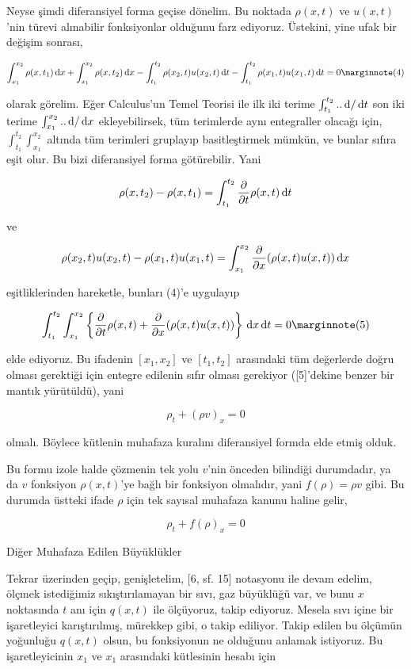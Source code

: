\documentclass[12pt,fleqn]{article}\usepackage{../../common}
\begin{document}
Neyse şimdi diferansiyel forma geçise dönelim. Bu noktada $\rho(x,t)$ ve
$u(x,t)$'nin türevi alınabilir fonksiyonlar olduğunu farz ediyoruz. Üstekini,
yine ufak bir değişim sonrası,

$$
\int _{x_1}^{x_2} \rho(x,t_1) \ud x  +
\int _{x_1}^{x_2} \rho(x,t_2) \ud x -
\int_{t_1}^{t_2}  \rho(x_2,t) u(x_2,t) \ud t -
\int_{t_1}^{t_2} \rho(x_1,t) u(x_1,t) \ud t = 0
\mlabel{4}
$$

olarak görelim. Eğer Calculus'un Temel Teorisi ile ilk iki terime
$\int_{t_1}^{t_2} .. \,\mathrm{d} / \,\mathrm{d} t$ son iki terime $\int_{x_1}^{x_2} .. \,\mathrm{d} / \,\mathrm{d} x$
ekleyebilirsek, tüm terimlerde aynı entegraller olacağı için, 
$\int_{t_1}^{t_2} \int_{x_1}^{x_2} $ altında tüm terimleri gruplayıp
basitleştirmek mümkün, ve bunlar sıfıra eşit olur. Bu bizi diferansiyel
forma götürebilir. Yani

$$
\rho(x,t_2) - \rho(x,t_1) = \int_{t_1}^{t_2}
\frac{\partial }{\partial t} \rho(x,t) \,\mathrm{d} t
$$

ve

$$
\rho(x_2,t)u(x_2,t) - \rho(x_1,t)u(x_1,t) =
\int _{x_1}^{x_2} \frac{\partial }{\partial x} (\rho(x,t)u(x,t)) \,\mathrm{d} x
$$

eşitliklerinden hareketle, bunları (4)'e uygulayıp

$$
\int _{t_1}^{t_2} \int _{x_1}^{x_2}  \left\{
\frac{\partial }{\partial t} \rho(x,t)  +
\frac{\partial }{\partial x} (\rho(x,t)u(x,t))
\right\} \ud x \ud t = 0
\mlabel{5}
$$

elde ediyoruz. Bu ifadenin $[x_1,x_2]$ ve $[t_1,t_2]$ arasındaki tüm değerlerde
doğru olması gerektiği için entegre edilenin sıfır olması gerekiyor ([5]'dekine
benzer bir mantık yürütüldü), yani

$$
\rho_t + (\rho v)_x = 0
$$

olmalı. Böylece kütlenin muhafaza kuralını diferansiyel formda elde etmiş olduk.

Bu formu izole halde çözmenin tek yolu $v$'nin önceden bilindiği durumdadır, ya
da $v$ fonksiyon $\rho(x,t)$'ye bağlı bir fonksiyon olmalıdır, yani
$f(\rho) = \rho v$ gibi. Bu durumda üstteki ifade $\rho$ için tek sayısal
muhafaza kanunu haline gelir,

$$
\rho_t + f(\rho)_x = 0
$$

Diğer Muhafaza Edilen Büyüklükler

Tekrar üzerinden geçip, genişletelim, [6, sf. 15] notasyonu ile devam edelim,
ölçmek istediğimiz sıkıştırılamayan bir sıvı, gaz büyüklüğü var, ve bunu $x$
noktasında $t$ anı için $q(x,t)$ ile ölçüyoruz, takip ediyoruz. Mesela sıvı
içine bir işaretleyici karıştırılmış, mürekkep gibi, o takip ediliyor. Takip
edilen bu ölçümün yoğunluğu $q(x,t)$ olsun, bu fonksiyonun ne olduğunu anlamak
istiyoruz. Bu işaretleyicinin $x_1$ ve $x_1$ arasındaki kütlesinin hesabı için
\end{document}
